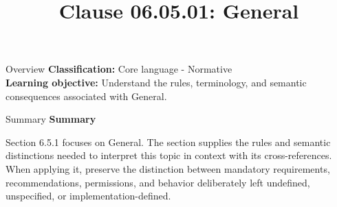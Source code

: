\documentclass[10pt,letterpaper]{article}
\title{Clause 06.05.01: General}
\author{}
\date{}
\begin{document}
\maketitle
\begin{CornellOverviewBox}{Overview}
\textbf{Classification:} Core language - Normative\\[2pt]
\textbf{Learning objective:} Understand the rules, terminology, and semantic consequences associated with General.
\end{CornellOverviewBox}\begin{CornellSummaryBox}{Summary}
{\sffamily\bfseries\color{Accent} Summary}\par\vspace{3pt}Section 6.5.1 focuses on General. The section supplies the rules and semantic distinctions needed to interpret this topic in context with its cross-references. When applying it, preserve the distinction between mandatory requirements, recommendations, permissions, and behavior deliberately left undefined, unspecified, or implementation-defined.
\end{CornellSummaryBox}
\end{document}
